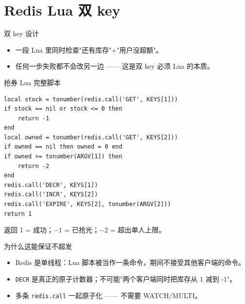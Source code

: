 \section{Redis Lua 双 key}

\begin{frame}{双 key 设计}
\vspace{2mm}
\begin{itemize}
  \item 一段 Lua 里同时检查"还有库存"+"用户没超额"。
  \item 任何一步失败都不会改另一边 —— 这是双 key 必须 Lua 的本质。
\end{itemize}
\end{frame}

\begin{frame}[fragile]{抢券 Lua 完整脚本}
\begin{lstlisting}[language=LuaRedis,firstnumber=30,
  caption={\srcnote{repository/cache/coupon.go:30--44}}]
local stock = tonumber(redis.call('GET', KEYS[1]))
if stock == nil or stock <= 0 then
    return -1
end
local owned = tonumber(redis.call('GET', KEYS[2]))
if owned == nil then owned = 0 end
if owned >= tonumber(ARGV[1]) then
    return -2
end
redis.call('DECR', KEYS[1])
redis.call('INCR', KEYS[2])
redis.call('EXPIRE', KEYS[2], tonumber(ARGV[2]))
return 1
\end{lstlisting}
\vspace{1mm}
\small 返回 1 = 成功；$-1$ = 已抢光；$-2$ = 超出单人上限。
\end{frame}

\begin{frame}{为什么这能保证不超发}
\begin{itemize}
  \item Redis 是单线程：Lua 脚本被当作一条命令，期间不接受其他客户端的命令。
  \item \texttt{DECR} 是真正的原子计数器；不可能"两个客户端同时把库存从 1 减到 -1"。
  \item 多条 \texttt{redis.call} 一起原子化 —— 不需要 WATCH/MULTI。
\end{itemize}
\vspace{2mm}
\end{frame}


